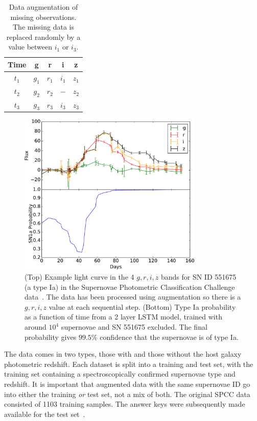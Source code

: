 \documentclass[nofootinbib,amsmath,amssymb,10pt,eqsecnum, twocolumn]{revtex4-1}
\begin{document}
\begin{table}[htdp]
\begin{center}
\begin{tabular}{|c|c|c|c|c|} \hline  
 Time & g & r & i & z \\ \hline \hline 
$ t_1$  & $g_1$ & $r_1$ &$ i_1$ & $z_1$ \\ \hline 
$ t_2$  & $g_2$ & $r_2$ &$  - $ & $z_2$ \\ \hline 
$ t_3$  & $g_3$ & $r_3$ &$ i_3$ & $z_3$ \\ \hline 
 \end{tabular}
\end{center}
\label{tab:augment}
\caption{Data augmentation of missing observations. The missing data is replaced randomly by a value between $i_1$ or $i_3$.}
\end{table}%

\begin{figure}
\centering
\includegraphics[width=88mm, angle=0]{DES_SN551675.pdf}
\caption{\label{fig:lightcurve} (Top) Example light curve in the 4 $g, r, i, z$ bands for SN ID 551675 (a type Ia) in the Supernovae Photometric Classification Challenge data~\cite{Kessler:2010wk}. The data has been processed using augmentation so there is a $g, r, i, z$ value at each sequential step. (Bottom) Type Ia probability as a function of time from a 2 layer LSTM model, trained with around $10^4$ supernovae and SN 551675 excluded. The final probability gives $99.5\%$ confidence that the supernovae is of type Ia. 
 }
\end{figure}


The data comes in two types, those with and those without the  host galaxy photometric redshift. Each dataset is split into a training and test set, with the training set containing a spectroscopically confirmed supernovae type and redshift. It is important that augmented data with the same supernovae ID go into either the training {\em or} test set, not a mix of both. The original SPCC data consisted of 1103 training samples. The answer keys were subsequently made available for the test set~\cite{Kessler:2010qj}. 
\end{document}

